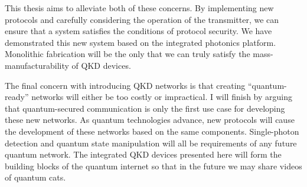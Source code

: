 This thesis aims to alleviate both of these concerns. By implementing new protocols and carefully considering the operation of the transmitter, we can ensure that a system satisfies the conditions of protocol security. We have demonstrated this new system based on the integrated photonics platform. Monolithic fabrication will be the only that we can truly satisfy the mass-manufacturability of \ac{QKD} devices. 

The final concern with introducing \ac{QKD} networks is that creating ``quantum-ready'' networks will either be too costly or impractical. I will finish by arguing that quantum-secured communication is only the first use case for developing these new networks. As quantum technologies advance, new protocols will cause the development of these networks based on the same components. Single-photon detection and quantum state manipulation will all be requirements of any future quantum network. The integrated \ac{QKD} devices presented here will form the building blocks of the quantum internet so that in the future we may share videos of quantum cats.






